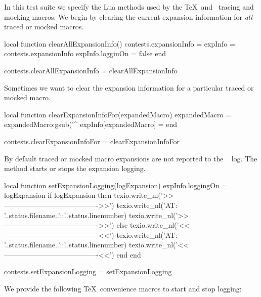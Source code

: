 
In this test suite we specify the Lua methods used by the \TeX\ and 
\ConTeXt\ tracing and mocking macros. We begin by clearing the current 
expansion information for \emph{all} traced or mocked macros. 

\startLuaCode
local function clearAllExpansionInfo()
  contests.expansionInfo = { }
  expInfo                = contests.expansionInfo
  expInfo.logginOn       = false
end

contests.clearAllExpansionInfo = clearAllExpansionInfo
\stopLuaCode

\startMkIVCode
\def\clearAllExpansionInfo{%
  \directlua{%
    thirddata.contests.clearAllExpansionInfo()
  }
}
\stopMkIVCode

Sometimes we want to clear the expansion information for a particular 
traced or mocked macro. 

\startLuaCode
local function clearExpansionInfoFor(expandedMacro)
  expandedMacro = expandedMacro:gsub('^%
  expInfo[expandedMacro] = { }
end

contests.clearExpansionInfoFor = clearExpansionInfoFor
\stopLuaCode

\startMkIVCode
\def\clearExpansionInfoFor#1{%
  \directlua{%
    thirddata.contests.clearExpansionInfoFor('#1')
  }
}
\stopMkIVCode

By default traced or mocked macro expansions are not reported to the 
\LuaTeX\  log. The  method starts or 
stops the expansion logging. 

\startLuaCode
local function setExpansionLogging(logExpansion)
  expInfo.loggingOn = logExpansion
  if logExpansion then
    texio.write_nl('>>---------------------------------------->>')
    texio.write_nl('AT: '..status.filename..'::'..status.linenumber)
    texio.write_nl('>>---------------------------------------->>')
  else
    texio.write_nl('<<----------------------------------------<<')
    texio.write_nl('AT: '..status.filename..'::'..status.linenumber)
    texio.write_nl('<<----------------------------------------<<')
  end
end

contests.setExpansionLogging = setExpansionLogging
\stopLuaCode

We provide the following \TeX\ convenience macros to start and stop 
logging: 

\startMkIVCode
\def\startLoggingExpansions{%
  \directlua{thirddata.contests.setExpansionLogging(true)}
}

